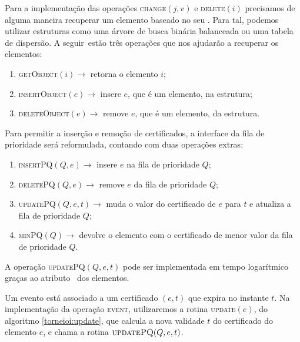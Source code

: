 Para a implementação das operações \textsc{change}$(j, v)$ e
\textsc{delete}$(i)$ precisamos de alguma maneira recuperar um
elemento baseado no seu \id. Para tal, podemos utilizar estruturas
como uma árvore de busca binária balanceada ou uma tabela de
dispersão. A seguir~estão três operações que nos ajudarão a
recuperar os elementos:
\begin{enumerate}
    \item \textsc{getObject}$(i)\rightarrow$ retorna o elemento $i$;
    \item \textsc{insertObject}$(e) \rightarrow$ insere $e$, que é
    um elemento, na estrutura;
    \item \textsc{deleteObject}$(e) \rightarrow$ remove $e$, que é
    um elemento, da estrutura.
\end{enumerate}
Para permitir a inserção e remoção de certificados, a interface da
fila de prioridade será reformulada, contando com duas operações
extras:
\begin{enumerate}
    \item \textsc{insertPQ}$(Q, e) \rightarrow$ insere $e$ na fila
    de prioridade $Q$;
    \item \textsc{deletePQ}$(Q, e) \rightarrow$ remove $e$ da fila
    de prioridade $Q$;
    \item \textsc{updatePQ}$(Q,e,t) \rightarrow$ muda o valor do
    certificado de $e$ para $t$ e atualiza a fila de prioridade $Q$;
    \item \textsc{minPQ}$(Q) \rightarrow$ devolve o elemento com o
    certificado de menor valor da fila de prioridade $Q$.
\end{enumerate}
A operação \textsc{updatePQ}$(Q,e,t)$ pode ser implementada em tempo
logarítmico graças ao atributo \pqpos~dos elementos.

Um evento está associado a um certificado $(e, t)$ que expira no
instante $t$. Na implementação da operação \textsc{event},
utilizaremos a rotina \textsc{update}$(e)$, do algoritmo
\ref{torneioi:update}, que calcula a nova validade $t$ do
certificado do elemento $e$, e chama a rotina $\textsc{updatePQ}(Q,
e, t)$.

